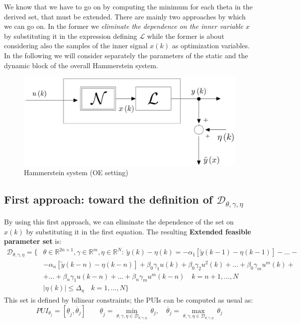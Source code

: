 \noindent
We know that we have to go on by computing the minimum for each theta in the derived set, that must be extended. There are mainly two approaches by which we can go on. In the former we \textit{eliminate the dependence on the inner variable $x$} by substituting it in the expression defining $\mathcal{L}$ while the former is about considering also the samples of the inner signal $x(k)$ as optimization variables. In the following we will consider separately the parameters of the static and the dynamic block of the overall Hammerstein system.

\begin{figure}
    \centering
    \includegraphics[scale=0.2]{img/hammer_OE.jpg}
    \caption{Hammerstein system (OE setting)}
\end{figure}

\subsection{First approach: toward the definition of $\mathcal{D}_{\theta,\gamma,\eta}$}
By using this first approach, we can eliminate the dependence of the set on $x(k)$ by substituting it in the first equation. The resulting \textbf{Extended feasible parameter set} is:
\begin{equation}
    \begin{aligned}
        \mathcal{D}_{\theta,\gamma, \eta}=\{&
        \theta\in\mathbb{R}^{2n+1}, \gamma\in\mathbb{R}^{m}, \eta\in\mathbb{R}^N: \  
        \tilde{y}(k)-\eta(k)=-\alpha_1[\tilde{y}(k-1)-\eta(k-1)]-\dots-\\
        &-\alpha_n[\tilde{y}(k-n)-\eta(k-n)] +
        \beta_0\gamma_1{u(k)} + \beta_0{\gamma_2}{u^2(k)} +\dots+\beta_0\gamma_m{u^m(k)}+\\
        &+...+\beta_n{\gamma_1}{u(k-n)}+...+\beta_n{\gamma_m}{u^m(k-n)} \quad k=n+1,...,N\\
        &\vert \eta(k) \vert \le \Delta_\eta \quad k=1,...,N
    \}
    \end{aligned}
\end{equation}
This set is defined by bilinear constraints; the PUIs can be computed as usual as: 
\begin{equation}
    PUI_{\theta_j} = [
        \underline{\theta}_j,
        \overline{\theta}_j
    ] \qquad 
    \underline{\theta}_j=\min_{\theta,\gamma,\eta\in{\mathcal{D}_{\theta,\gamma,\eta}}} \ {\theta_j}, \quad
    \overline{\theta}_j=\max_{\theta,\gamma,\eta\in{\mathcal{D}_{\theta,\gamma,\eta}}} \ {\theta_j} 
\end{equation}

